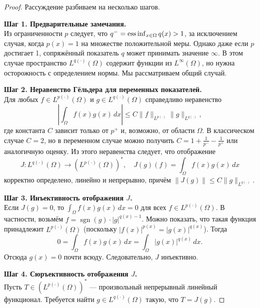 \documentclass[../NDCNNAI_main.tex]{subfiles}
\begin{document}
\begin{proof}
Рассуждение разбиваем на несколько шагов.

\noindent
\textbf{Шаг 1. Предварительные замечания.}\\
Из ограниченности \( p \) следует, что \( q^- = \operatorname*{ess\,inf}_{x \in \Omega} q(x) > 1 \), за исключением случая, когда \( p(x) = 1 \) на множестве положительной меры. Однако даже если \( p \) достигает 1, сопряжённый показатель \( q \) может принимать значение \( \infty \). В этом случае пространство \( L^{q(\cdot)}(\Omega) \) содержит функции из \( L^\infty(\Omega) \), но нужна осторожность с определением нормы. Мы рассматриваем общий случай.

\noindent
\textbf{Шаг 2. Неравенство Гёльдера для переменных показателей.}\\
Для любых \( f \in L^{p(\cdot)}(\Omega) \) и \( g \in L^{q(\cdot)}(\Omega) \) справедливо неравенство
\[
\left| \int_{\Omega} f(x)g(x) \, dx \right| \leq C \|f\|_{L^{p(\cdot)}} \|g\|_{L^{q(\cdot)}},
\]
где константа \( C \) зависит только от \( p^+ \) и, возможно, от области \( \Omega \). В классическом случае \( C = 2 \), но в переменном случае можно получить \( C = 1 + \frac{1}{p^-} - \frac{1}{p^+} \) или аналогичную оценку. Из этого неравенства следует, что отображение
\[
J \colon L^{q(\cdot)}(\Omega) \to (L^{p(\cdot)}(\Omega))^*, \quad J(g)(f) = \int_{\Omega} f(x)g(x) \, dx
\]
корректно определено, линейно и непрерывно, причём \( \|J(g)\| \leq C \|g\|_{L^{q(\cdot)}} \).

\noindent
\textbf{Шаг 3. Инъективность отображения \( J \).}\\
Если \( J(g) = 0 \), то \( \int_{\Omega} f(x)g(x) \, dx = 0 \) для всех \( f \in L^{p(\cdot)}(\Omega) \). В частности, возьмём \( f = \operatorname{sgn}(g) \cdot |g|^{q(x)-1} \). Можно показать, что такая функция принадлежит \( L^{p(\cdot)}(\Omega) \) (поскольку \( |f(x)|^{p(x)} = |g(x)|^{q(x)} \)). Тогда
\[
0 = \int_{\Omega} f(x)g(x) \, dx = \int_{\Omega} |g(x)|^{q(x)} \, dx.
\]
Отсюда \( g(x) = 0 \) почти всюду. Следовательно, \( J \) инъективно.

\noindent
\textbf{Шаг 4. Сюръективность отображения \( J \).}\\
Пусть \( T \in (L^{p(\cdot)}(\Omega))^* \) --- произвольный непрерывный линейный функционал. Требуется найти \( g \in L^{q(\cdot)}(\Omega) \) такую, что \( T = J(g) \).


\end{proof}
\end{document}
